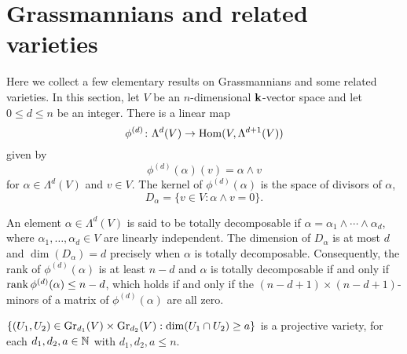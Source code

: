 \documentclass[a4paper, 11pt]{report}
\begin{document}
\section{Grassmannians and related varieties}

Here we collect a few elementary results on Grassmannians and some related varieties. In this section, let $V$ be an $n$-dimensional $\field$-vector space and let $0\le d\le n$ be an integer. There is a linear map
\begin{equation*}
\phi^{(d)}\colon\Lambda^d(V)\to\HOM(V,\Lambda^{d+1}(V))
\end{equation*}
given by
\begin{equation*}
\phi^{(d)}(\alpha)(v)=\alpha\wedge v
\end{equation*}
for $\alpha\in\Lambda^d(V)$ and $v\in V$.
The kernel of $\phi^{(d)}(\alpha)$ is the space of divisors of $\alpha$,
\begin{equation*}
D_\alpha=\{v\in V:\alpha\wedge v=0\}.
\end{equation*}

An element $\alpha\in\Lambda^d(V)$ is said to be totally decomposable if $\alpha = \alpha_1\wedge\cdots\wedge\alpha_d$, where $\alpha_1,\ldots,\alpha_d\in V$ are linearly independent. The dimension of $D_\alpha$ is at most $d$ and $\dim(D_\alpha)=d$ precisely when $\alpha$ is totally decomposable. Consequently, the rank of $\phi^{(d)}(\alpha)$ is at least $n-d$ and $\alpha$ is totally decomposable if and only if $\rank{\phi^{(d)}(\alpha)}\le n-d$, which holds if and only if the $(n-d+1)\times(n-d+1)$-minors of a matrix of $\phi^{(d)}(\alpha)$ are all zero.

\begin{lemma}\label{lemma:grassmannian-incidence-varieties}
$\{(U_1,U_2)\in\GR[d_1]{V}\times\GR[d_2]{V}: \dim(U_1\cap U_2)\geq a\}$ is a projective variety, for each $d_1,d_2,a\in\naturals$ with $d_1,d_2,a\le n$.
\end{lemma}
\end{document}
